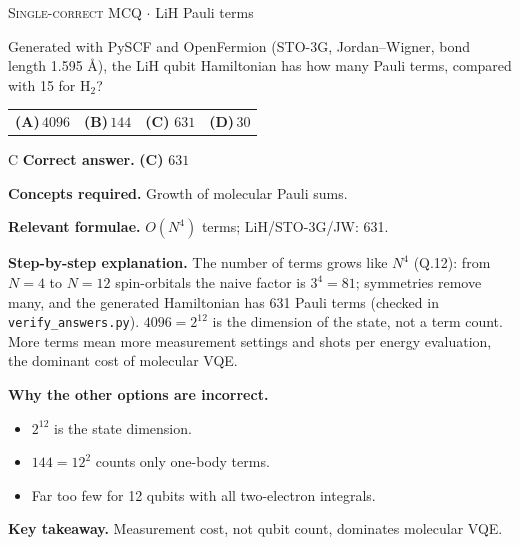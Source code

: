 \documentclass[11pt,a4paper]{article}
\newcommand{\optlabel}[1]{\textbf{(#1)}}
\newcommand{\correctlabel}[1]{\textcolor{okgreen}{\textbf{(#1)}\,\ding{51}}}
\newenvironment{qitem}[1]{\begin{list}{}{\setlength{\leftmargin}{3.3em}\setlength{\labelwidth}{3.1em}%
  \setlength{\labelsep}{0.2em}\setlength{\topsep}{3pt}\setlength{\parsep}{3pt}}\item[\textbf{Q.#1}\hfill]}{\end{list}}
\newcommand{\qsep}{\par\vspace{2pt}{\color{black!15}\hrule}\vspace{4pt}}
\newcommand{\qmeta}[2]{{\footnotesize\color{black!60}\textsc{#1} \;$\cdot$\; #2}\par}
\begin{document}
\begin{qitem}{78}
\qmeta{Single-correct MCQ}{LiH Pauli terms}
Generated with PySCF and OpenFermion (STO-3G, Jordan--Wigner, bond length 1.595 \AA), the LiH qubit Hamiltonian has how many Pauli terms, compared with
15 for H$_2$?
\par\smallskip\noindent\begin{tabularx}{\linewidth}{@{}*{4}{L}@{}}
\optlabel{A}\,$4096$ & \optlabel{B}\,$144$ & \correctlabel{C}\,$631$ & \optlabel{D}\,$30$
\end{tabularx}
\end{qitem}
\begin{solbox}{C}
\textbf{\color{brand}Correct answer.} \textcolor{okgreen}{\textbf{(C)}} $631$

\textbf{\color{brand}Concepts required.} Growth of molecular Pauli sums.

\textbf{\color{brand}Relevant formulae.} $O(N^4)$ terms; LiH/STO-3G/JW: 631.

\textbf{\color{brand}Step-by-step explanation.} The number of terms grows like $N^4$ (Q.12): from $N = 4$ to $N = 12$ spin-orbitals the naive factor is $3^4 = 81$; symmetries remove many, and the
generated Hamiltonian has 631 Pauli terms (checked in \texttt{verify\_answers.py}). $4096 = 2^{12}$ is the dimension of the state, not a term count.
More terms mean more measurement settings and shots per energy evaluation, the dominant cost of molecular VQE.

\textbf{\color{brand}Why the other options are incorrect.}
\begin{itemize}[leftmargin=2.4em, itemsep=1pt, topsep=2pt]
\item[\textbf{(A)}] $2^{12}$ is the state dimension.
\item[\textbf{(B)}] $144 = 12^2$ counts only one-body terms.
\item[\textbf{(D)}] Far too few for 12 qubits with all two-electron integrals.
\end{itemize}
\textbf{\color{brand}Key takeaway.} Measurement cost, not qubit count, dominates molecular VQE.
\end{solbox}
\qsep
\end{document}
